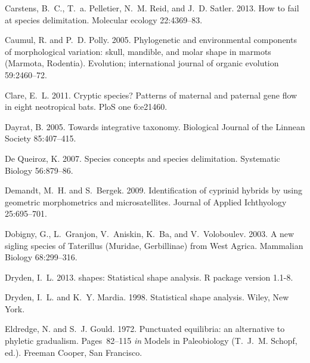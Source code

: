 \documentclass[12pt,letterpaper]{article}
\begin{document}
\begin{thebibliography}{77}
    Carstens, B.~C., T.~a. Pelletier, N.~M. Reid, and J.~D. Satler. 2013. {How to
    fail at species delimitation.} Molecular ecology 22:4369--83.

    Caumul, R. and P.~D. Polly. 2005. {Phylogenetic and environmental components of
      morphological variation: skull, mandible, and molar shape in marmots
    (Marmota, Rodentia).} Evolution; international journal of organic evolution
    59:2460--72.

    Clare, E.~L. 2011. {Cryptic species? Patterns of maternal and paternal gene
    flow in eight neotropical bats.} PloS one 6:e21460.

    Dayrat, B. 2005. {Towards integrative taxonomy}. Biological Journal of the
    Linnean Society 85:407--415.

    {De Queiroz}, K. 2007. {Species concepts and species delimitation.} Systematic
    Biology 56:879--86.

    Demandt, M.~H. and S.~Bergek. 2009. {Identification of cyprinid hybrids by
    using geometric morphometrics and microsatellites}. Journal of Applied
    Ichthyology 25:695--701.

    Dobigny, G., L.~Granjon, V.~Aniskin, K.~Ba, and V.~Voloboulev. 2003. {A new
    sigling species of Taterillus (Muridae, Gerbillinae) from West Agrica}.
    Mammalian Biology 68:299--316.

    Dryden, I.~L. 2013. shapes: Statistical shape analysis. R package version
    1.1-8.

    Dryden, I.~L. and K.~Y. Mardia. 1998. {Statistical shape analysis}. Wiley, New
    York.

    Eldredge, N. and S.~J. Gould. 1972. {Punctuated equilibria: an alternative to
    phyletic gradualism}. Pages~82--115 \emph{in} Models in Paleobiology
    (T.~J.~M. Schopf, ed.). Freeman Cooper, San Francisco.


\end{thebibliography}
\end{document}
